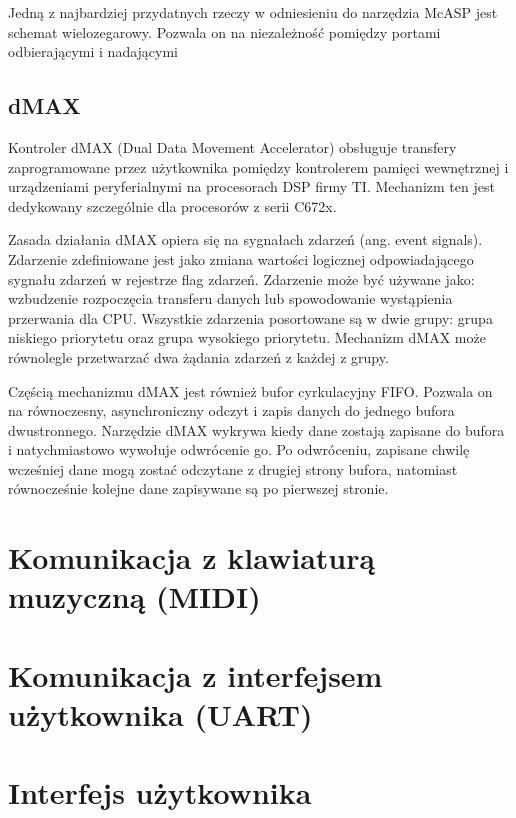 Jedną z najbardziej przydatnych rzeczy w odniesieniu do narzędzia McASP jest schemat wielozegarowy. Pozwala on na niezależność pomiędzy portami odbierającymi i nadającymi

\subsection{dMAX}
Kontroler dMAX (Dual Data Movement Accelerator) obsługuje transfery zaprogramowane przez użytkownika pomiędzy kontrolerem pamięci wewnętrznej i urządzeniami peryferialnymi na procesorach DSP firmy TI. Mechanizm ten jest dedykowany szczególnie dla procesorów z serii C672x.

Zasada działania dMAX opiera się na sygnałach zdarzeń (ang. event signals). Zdarzenie zdefiniowane jest jako zmiana wartości logicznej odpowiadającego sygnału zdarzeń w rejestrze flag zdarzeń. Zdarzenie może być używane jako: wzbudzenie rozpoczęcia transferu danych lub spowodowanie wystąpienia przerwania dla CPU. Wszystkie zdarzenia posortowane są w dwie grupy: grupa niskiego priorytetu oraz grupa wysokiego priorytetu. Mechanizm dMAX może równolegle przetwarzać dwa żądania zdarzeń z każdej z grupy.

Częścią mechanizmu dMAX jest również bufor cyrkulacyjny FIFO. Pozwala on na równoczesny, asynchroniczny odczyt i zapis danych do jednego bufora dwustronnego. Narzędzie dMAX wykrywa kiedy dane zostają zapisane do bufora i natychmiastowo wywołuje odwrócenie go. Po odwróceniu, zapisane chwilę wcześniej dane mogą zostać odczytane z drugiej strony bufora, natomiast równocześnie kolejne dane zapisywane są po pierwszej stronie.


\section{Komunikacja z klawiaturą muzyczną  (MIDI)}




\section{Komunikacja z interfejsem użytkownika (UART)}




\section{Interfejs użytkownika}




